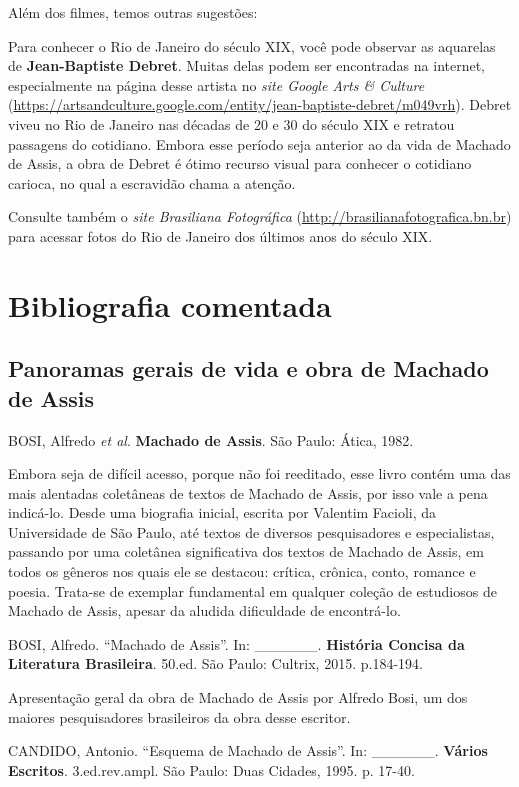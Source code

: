 \documentclass[11pt]{extarticle}
\begin{document}
Além dos filmes, temos outras sugestões:

Para conhecer o Rio de Janeiro do século XIX, você pode observar as
aquarelas de \textbf{Jean-Baptiste Debret}. Muitas delas podem ser
encontradas na internet, especialmente na página desse artista no
\emph{site Google Arts \& Culture}
(\url{https://artsandculture.google.com/entity/jean-baptiste-debret/m049vrh}).
Debret viveu no Rio de Janeiro nas décadas de 20 e 30 do século XIX e
retratou passagens do cotidiano. Embora esse período seja anterior ao da
vida de Machado de Assis, a obra de Debret é ótimo recurso visual para
conhecer o cotidiano carioca, no qual a escravidão chama a atenção.

Consulte também o \emph{site Brasiliana Fotográfica}
(\url{http://brasilianafotografica.bn.br}) para acessar fotos do Rio de
Janeiro dos últimos anos do século XIX.

\section{Bibliografia comentada}

\subsection{Panoramas gerais de vida e obra de Machado de Assis}

BOSI, Alfredo \emph{et al}. \textbf{Machado de Assis}. São Paulo: Ática,
1982.

Embora seja de difícil acesso, porque não foi reeditado, esse livro
contém uma das mais alentadas coletâneas de textos de Machado de Assis,
por isso vale a pena indicá-lo. Desde uma biografia inicial, escrita por
Valentim Facioli, da Universidade de São Paulo, até textos de diversos
pesquisadores e especialistas, passando por uma coletânea significativa
dos textos de Machado de Assis, em todos os gêneros nos quais ele se
destacou: crítica, crônica, conto, romance e poesia. Trata-se de
exemplar fundamental em qualquer coleção de estudiosos de Machado de
Assis, apesar da aludida dificuldade de encontrá-lo.

BOSI, Alfredo. ``Machado de Assis''. In: \_\_\_\_\_\_. \textbf{História
Concisa da Literatura Brasileira}. 50.ed. São Paulo: Cultrix, 2015.
p.184-194.

Apresentação geral da obra de Machado de Assis por Alfredo Bosi, um dos
maiores pesquisadores brasileiros da obra desse escritor.

CANDIDO, Antonio. ``Esquema de Machado de Assis''. In: \_\_\_\_\_\_.
\textbf{Vários Escritos}. 3.ed.rev.ampl. São Paulo: Duas Cidades, 1995.
p. 17-40.
\end{document}
